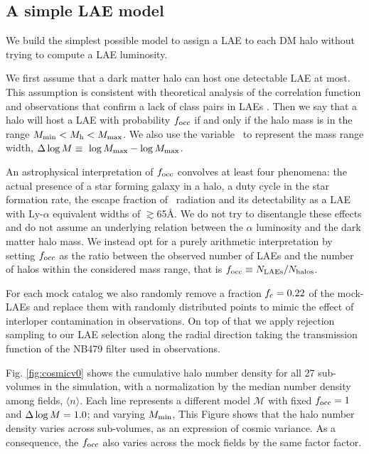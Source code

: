 \documentclass{emulateapj}
\newcommand{\ly}{{\ifmmode{{\rm Ly}\alpha}\else{Ly$\alpha$}\fi}}
\newcommand{\mmin}{{\ifmmode{{M_{\rm min}}}\else{${M_{\rm min}}$}\fi}}
\newcommand{\mmax}{{\ifmmode{{M_{\rm max}}}\else{${M_{\rm max}}$}\fi}}
\newcommand{\dlm}{{\ifmmode{{\Delta \log M}}\else{$\Delta \log M$}\fi}}
\newcommand{\focc}{{\ifmmode{{f_{\rm occ}}}\else{${f_{\rm occ}}$}\fi}}
\begin{document}
\subsection{A simple LAE model}
\label{subsec:mocks}

We build the simplest possible model to assign a LAE to each DM halo
without trying to compute a LAE luminosity.
  
We first assume that a dark matter halo can host one detectable LAE at
most.   
This assumption is consistent with theoretical analysis of the
correlation function \citep{Jose2013b} and observations that confirm a
lack of  class pairs in LAEs \citep{Bond2009}.  
Then we say that a halo will host a LAE with probability $\focc$
if and only if the halo mass is in the range $\mmin < M_{\mathrm
  h} < \mmax$. 
We also use the variable \dlm\ to represent the mass range width,
$\dlm\equiv\ \log \mmax - \log \mmax$.  


An astrophysical interpretation of $f_{\rm occ}$ convolves at least
four phenomena: the actual presence of a star forming galaxy in a
halo, a duty cycle in the star formation rate, the escape fraction of
\ly\ radiation and its detectability as a LAE with Ly-$\alpha$ equivalent widths of $\gtrsim$65\AA.   
We do not try to disentangle these effects and do not assume an underlying relation between the
$\alpha$ luminosity and the dark matter halo mass.
We instead opt for a purely arithmetic interpretation by setting
$\focc$ as the ratio between the observed number of LAEs and the
number of halos within the considered mass range, that is $\focc \equiv N_{\rm
  LAEs}/N_{\mathrm{halos}}$.   

For each mock catalog we also randomly remove a fraction $f_{\rm c}=0.22$  of the mock-LAEs and replace 
them with randomly distributed points to mimic the effect of interloper
contamination   in \citet{Bielby16} observations. 
On top of that we apply rejection sampling  to our LAE selection 
along the radial direction taking the transmission function of the
NB479 filter used in \citet{Bielby16} observations. 



Fig. \ref{fig:cosmicv0}  shows the cumulative halo number density
for all 27 sub-volumes in the simulation, with a normalization by the
median number density among fields, $\langle n \rangle$. 
Each line represents a different model $\mathcal{M}$ with fixed
$\focc=1$ and $\dlm=1.0$; and varying $\mmin$, 
This Figure shows that the halo number  density varies across
sub-volumes, as an expression of cosmic variance. 
As a consequence, the $\focc$ also varies across the mock fields  
by the same factor factor. 
\end{document}
